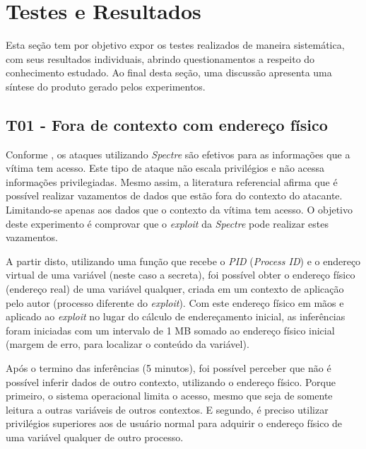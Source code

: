\documentclass[
	article,			    %
	12pt,				    %
	oneside,			    %
	a4paper,			    %
	chapter=TITLE,		    %
	section=TITLE,		    %
	subsection=TITLE,	    %
	english,			    %
	brazil,				    %
	sumario=tradicional
]{abntex2}
\begin{document}
\section{Testes e Resultados}
Esta seção tem por objetivo expor os testes realizados de maneira sistemática, com seus resultados individuais, abrindo questionamentos a respeito do conhecimento estudado. Ao final desta seção, uma discussão apresenta uma síntese do produto gerado pelos experimentos.
\subsection{T01 - Fora de contexto com endereço físico}
Conforme , os ataques utilizando \emph{Spectre} são efetivos para as informações que a vítima tem acesso. Este tipo de ataque não escala privilégios e não acessa informações privilegiadas. Mesmo assim, a literatura referencial afirma que é possível realizar vazamentos de dados que estão fora do contexto do atacante. Limitando-se apenas aos dados que o contexto da vítima tem acesso. O objetivo deste experimento é comprovar que o \emph{exploit} da \emph{Spectre} pode realizar estes vazamentos.

A partir disto, utilizando uma função que recebe o \emph{PID} (\emph{Process ID}) e o endereço virtual de uma variável (neste caso a secreta), foi possível obter o endereço físico (endereço real) de uma variável qualquer, criada em um contexto de aplicação pelo autor (processo diferente do \emph{exploit}). Com este endereço físico em mãos e aplicado ao \emph{exploit} no lugar do cálculo de endereçamento inicial, as inferências foram iniciadas com um intervalo de 1 MB somado ao endereço físico inicial (margem de erro, para localizar o conteúdo da variável).

Após o termino das inferências (5 minutos), foi possível perceber que não é possível inferir dados de outro contexto, utilizando o endereço físico. Porque primeiro, o sistema operacional limita o acesso, mesmo que seja de somente leitura a outras variáveis de outros contextos. E segundo, é preciso utilizar privilégios superiores aos de usuário normal para adquirir o endereço físico de uma variável qualquer de outro processo.

\begin{comment}
https://www.eqware.net/articles/CapturingProcessMemoryUsageUnderLinux/index.html
https://stackoverflow.com/questions/5748492/is-there-any-api-for-determining-the-physical-address-from-virtual-address-in-li/45128487#45128487
\end{comment}
\end{document}
